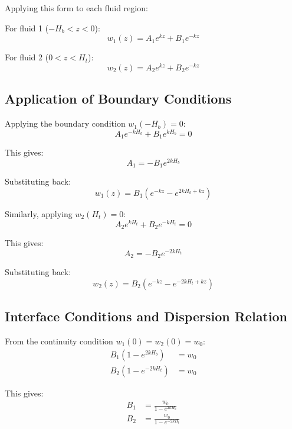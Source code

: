 \documentclass[12pt,a4paper]{article}
\begin{document}
Applying this form to each fluid region:

For fluid 1 ($-H_b < z < 0$):
\begin{equation}
w_1(z) = A_1e^{kz} + B_1e^{-kz}
\end{equation}

For fluid 2 ($0 < z < H_t$):
\begin{equation}
w_2(z) = A_2e^{kz} + B_2e^{-kz}
\end{equation}

\subsection{Application of Boundary Conditions}
Applying the boundary condition $w_1(-H_b) = 0$:
\begin{equation}
A_1e^{-kH_b} + B_1e^{kH_b} = 0
\end{equation}

This gives:
\begin{equation}
A_1 = -B_1e^{2kH_b}
\end{equation}

Substituting back:
\begin{equation}
w_1(z) = B_1(e^{-kz} - e^{2kH_b+kz})
\end{equation}

Similarly, applying $w_2(H_t) = 0$:
\begin{equation}
A_2e^{kH_t} + B_2e^{-kH_t} = 0
\end{equation}

This gives:
\begin{equation}
A_2 = -B_2e^{-2kH_t}
\end{equation}

Substituting back:
\begin{equation}
w_2(z) = B_2(e^{-kz} - e^{-2kH_t+kz})
\end{equation}

\subsection{Interface Conditions and Dispersion Relation}
From the continuity condition $w_1(0) = w_2(0) = w_0$:
\begin{align}
B_1(1 - e^{2kH_b}) &= w_0 \\
B_2(1 - e^{-2kH_t}) &= w_0
\end{align}

This gives:
\begin{align}
B_1 &= \frac{w_0}{1 - e^{2kH_b}} \\
B_2 &= \frac{w_0}{1 - e^{-2kH_t}}
\end{align}
\end{document}
